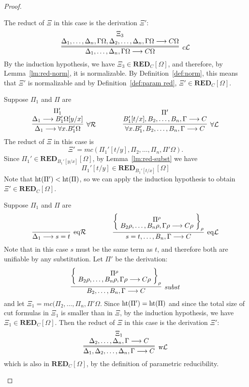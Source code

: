 \documentclass[preprint]{elsarticle}
\newcommand{\Seq}[2]{#1\longrightarrow #2}
\newcommand{\cL}{\hbox{\sl c}{\cal L}}
\newcommand{\eqL}{{\rm eq}{\cal L}}
\newcommand{\eqR}{{\rm eq}{\cal R}}
\newcommand{\forallL}{\forall{\cal L}}
\newcommand{\forallR}{\forall{\cal R}}
\newcommand{\measure}[1]{{\rm ht}(#1)}
\newcommand{\wL}{\hbox{\sl w}{\cal L}}
\def\RED{{\mathbf{RED}}}
\begin{document}
\begin{proof}
\begin{trivlist}
The reduct of $\Xi$ in this case is the derivation $\Xi'$:
\begin{displaymath}
  \infer=[\cL]
  {\Seq{\Delta_1,\ldots,\Delta_n,\Gamma\Omega}{C\Omega}}
  {
    \deduce
    {\Seq{\Delta_1,\ldots, \Delta_n,\Gamma\Omega,
        \Delta_2,\ldots, \Delta_n,\Gamma\Omega}
      {C\Omega}
    }
    {\Xi_3}
  }
\end{displaymath}
By the induction hypothesis, we have $\Xi_3 \in \RED_{C}[\Omega]$, and
therefore, by Lemma~\ref{lm:red-norm}, it is normalizable.  By
Definition~\ref{def:norm}, this means that $\Xi'$ is normalizable and
by Definition~\ref{def:param red}, $\Xi' \in \RED_C[\Omega]$.


\item[\fbox{$\forallL/\forallR$}] Suppose $\Pi_1$ and $\Pi$ are
$$
\infer[\forallR] {\Seq{\Delta_1}{\forall x.B_1'\Omega}} {
  \deduce{\Seq{\Delta_1}{B_1'\Omega[y/x]}}{\Pi_1'} } \qquad \qquad
\infer[\forallL] {\Seq{\forall x.B_1',B_2,\dots,B_n,\Gamma}{C}} {
  \deduce{\Seq{B_1'[t/x],B_2,\dots,B_n,\Gamma}{C}}{\Pi'} }
$$
The reduct of $\Xi$ in this case is
$$
\Xi' = mc(\Pi_1'[t/y], \Pi_2, \ldots, \Pi_n, \Pi'\Omega).
$$
Since $\Pi_1' \in \RED_{B_1'[y/x]}[\Omega]$, by
Lemma~\ref{lm:red-subst} we have
$$\Pi_1'[t/y] \in \RED_{B_1'[t/x]}[\Omega]$$
Note that $\measure{\Pi'} < \measure{\Pi}$, so we can apply the
induction hypothesis to obtain $\Xi' \in \RED_{C}[\Omega]$.


\item[\fbox{$\eqR/\eqL$}] Suppose $\Pi_1$ and $\Pi$ are
$$
\infer[\eqR] {\Seq{\Delta_1}{s = t}} {} \qquad \qquad \infer[\eqL]
{\Seq{s = t,\dots,B_n,\Gamma}{C}} {\left\{\raisebox{-1.5ex} {
      \deduce{\Seq{B_2\rho,\dots,B_n\rho,\Gamma\rho}{C\rho}}
      {\Pi^\rho} } \right\}_\rho }
$$
Note that in this case $s$ must be the same term as $t$, and therefore
both are unifiable by any substitution. 
Let $\Pi'$ be the derivation:
$$
\infer[subst]
{\Seq{B_2,\ldots,B_n,\Gamma}{C}}
{
\left\{
\raisebox{-1.3ex}{
\deduce{\Seq{B_2\rho,\ldots,B_n\rho,\Gamma\rho}{C\rho}}{\Pi^\rho}
}
\right\}_\rho
}
$$
and let $\Xi_1 = mc(\Pi_2,\ldots,\Pi_n,\Pi'\Omega$.
Since $\measure{\Pi'} = \measure{\Pi}$ and since the total size of cut 
formulas in $\Xi_1$ is smaller than in $\Xi$, by the induction hypothesis, we have
$\Xi_1 \in \RED_C[\Omega]$.
Then the reduct of $\Xi$ in this case is the derivation $\Xi'$:
$$
\infer=[\wL]
{\Seq{\Delta_1,\Delta_2,\ldots,\Delta_n,\Gamma}{C}}
{
\deduce{\Seq{\Delta_2,\ldots,\Delta_n,\Gamma}{C}}{\Xi_1}
}
$$
which is also in $\RED_C[\Omega]$, by the definition of parametric reducibility.



\end{trivlist}
\end{proof}
\end{document}
